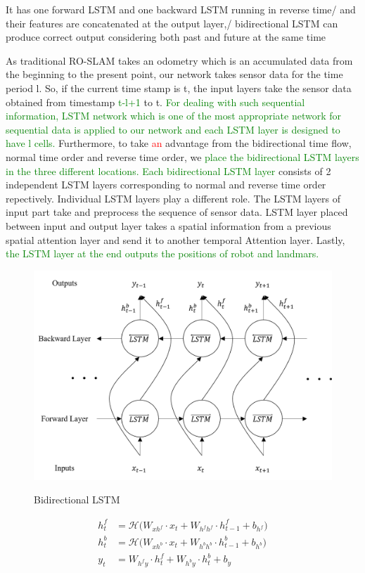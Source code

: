 \documentclass{ieeeaccess}
\begin{document}
It has one forward LSTM and one backward LSTM running in reverse time/ and their features are concatenated at the output layer,/ bidirectional LSTM can produce correct output considering both past and future at the same time

As traditional RO-SLAM \cite{blanco2008pure,blanco2008efficient} takes an odometry which is an accumulated data from the beginning to the present point, our network takes sensor data for the time period l. So, if the current time stamp is t, the input layers take the sensor data obtained from timestamp \textcolor{green}{t-l+1} to t. \textcolor{green}{For dealing with such sequential information, LSTM network which is one of the most appropriate network for sequential data is applied to our network and each LSTM layer is designed to have l cells.} Furthermore, to take \textcolor{red}{an} advantage from the bidirectional time flow, normal time order and reverse time order, we \textcolor{green}{place the bidirectional LSTM layers in the three different locations. Each bidirectional LSTM layer} consists of 2 independent LSTM layers corresponding to normal and reverse time order repectively. Individual LSTM layers play a different role. The LSTM layers of input part take and preprocess the sequence of sensor data. LSTM layer placed between input and output layer takes a spatial information from a previous spatial attention layer and send it to another temporal Attention layer. Lastly, \textcolor{green}{the LSTM layer at the end outputs the positions of robot and landmars.}


\begin{figure}[h!]
	\centering
	\includegraphics[width=.9\linewidth]{bidirectional}
	\label{fig:bidirectional} 	
	\caption{Bidirectional LSTM}
\end{figure}
\begin{align}
h^{f}_{t} & =\mathcal{H}\big(W_{xh^{f}}\cdot x_{t}+W_{h^{f}h^{f}}\cdot h^{f}_{t-1}+b_{h^{f}}\big)\\
h^{b}_{t} & =\mathcal{H}\big(W_{xh^{b}}\cdot x_{t}+W_{h^{b}h^{b}}\cdot h^{b}_{t-1}+b_{h^{b}}\big)\\
y_{t} & =W_{h^{f}y}\cdot h^{f}_{t}+W_{h^{b}y}\cdot h^{b}_{t}+b_{y}
\end{align}
\end{document}
